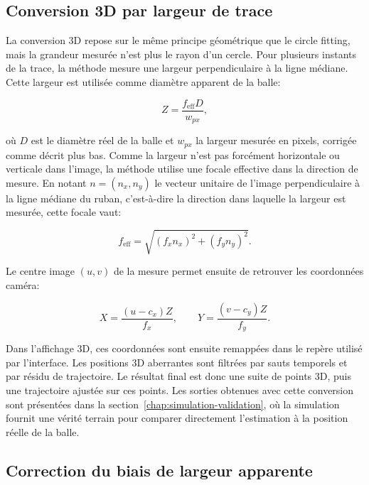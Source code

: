 \documentclass[a4paper,11pt]{report}
\begin{document}
\subsection{Conversion 3D par largeur de trace}

La conversion 3D repose sur le même principe géométrique que le circle fitting, mais la grandeur mesurée n'est plus le rayon d'un cercle. Pour plusieurs instants de la trace, la méthode mesure une largeur perpendiculaire à la ligne médiane. Cette largeur est utilisée comme diamètre apparent de la balle:

\begin{equation}
Z = \frac{f_{\text{eff}}D}{w_{px}},
\label{eq:profondeur-trace}
\end{equation}

où \(D\) est le diamètre réel de la balle et \(w_{px}\) la largeur mesurée en pixels, corrigée comme décrit plus bas. Comme la largeur n'est pas forcément horizontale ou verticale dans l'image, la méthode utilise une focale effective dans la direction de mesure. En notant \(n = (n_x, n_y)\) le vecteur unitaire de l'image perpendiculaire à la ligne médiane du ruban, c'est-à-dire la direction dans laquelle la largeur est mesurée, cette focale vaut:

\begin{equation}
f_{\text{eff}} =
\sqrt{(f_x n_x)^2 + (f_y n_y)^2}.
\label{eq:focale-effective}
\end{equation}

Le centre image \((u,v)\) de la mesure permet ensuite de retrouver les coordonnées caméra:

\begin{equation}
X = \frac{(u-c_x)Z}{f_x},
\qquad
Y = \frac{(v-c_y)Z}{f_y}.
\label{eq:projection-trace}
\end{equation}

Dans l'affichage 3D, ces coordonnées sont ensuite remappées dans le repère utilisé par l'interface. Les positions 3D aberrantes sont filtrées par sauts temporels et par résidu de trajectoire. Le résultat final est donc une suite de points 3D, puis une trajectoire ajustée sur ces points. Les sorties obtenues avec cette conversion sont présentées dans la section~\ref{chap:simulation-validation}, où la simulation fournit une vérité terrain pour comparer directement l'estimation à la position réelle de la balle.

\subsection{Correction du biais de largeur apparente}
\end{document}
